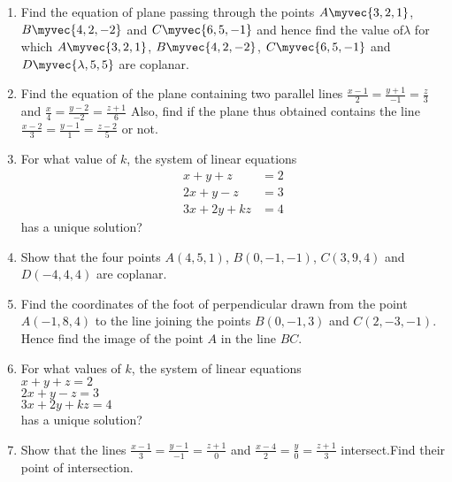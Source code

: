 \begin{enumerate}
	\item Find the equation of plane passing through the points $A\myvec{3 , 2 , 1}$,
	      $B\myvec{4, 2, -2}$ and $C\myvec{6, 5, -1}$ and hence find the value of$\lambda$ for which
	      $A\myvec{3, 2 , 1}$, $B\myvec{4 , 2 , -2}$, $C\myvec{6 , 5 , -1}$ and $D\myvec{\lambda , 5 , 5}$
	      are coplanar.

	\item Find the equation of the plane containing two parallel lines
	      $\frac{x-1}{2} = \frac{y+1}{-1} = \frac{z}{3}$ and $\frac{x}{4} = \frac{y-2}{-2} = \frac{z+1}{6}$
	      Also, find if the plane thus obtained contains the line
	      $\frac{x-2}{3} =\frac{y-1}{1} = \frac{z-2}{5}$ or not.



	\item For what value of $k$, the system of linear equations
	      \begin{align*}
		      x+y+z    & = 2 \\
		      2x+y-z   & =3  \\
		      3x+2y+kz & =4
	      \end{align*}
	      has a unique solution?

	\item Show that the four points $A(4,5,1)$, $ B(0,-1,-1)$,
	      $C(3,9,4)$ and $D(-4,4,4)$ are coplanar.

	\item Find the coordinates of the foot of perpendicular drawn from the point
	      $A(-1, 8, 4)$ to the line joining the points $B(0, -1, 3)$ and $C(2,-3,-1)$. Hence
	      find the image of the point $A$ in the line $BC$.
	\item For what values of $k$, the system of linear equations\\
	      $x+y+z=2$\\
	      $2x+y-z=3$\\
	      $3x+2y+kz=4$\\
	      has a unique solution?
	\item Show that the lines $\frac{x-1}{3} = \frac{y-1}{-1} = \frac{z+1}{0} $ and $\frac{x-4}{2} = \frac{y}{0} = \frac{z+1}{3} $ intersect.Find their point of intersection.

\end{enumerate}
